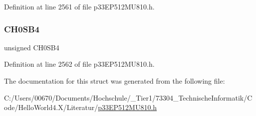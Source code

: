 Definition at line 2561 of file p33\+E\+P512\+M\+U810.\+h.

\mbox{\label{structtag_a_d1_c_h_s0_b_i_t_s_a4f65ab47f0d8e69cd9826d4a74fb614b}} 
\subsubsection{\texorpdfstring{C\+H0\+S\+B4}{CH0SB4}}
{\footnotesize\ttfamily unsigned C\+H0\+S\+B4}



Definition at line 2562 of file p33\+E\+P512\+M\+U810.\+h.



The documentation for this struct was generated from the following file\+:\begin{DoxyCompactItemize}
\item 
C\+:/\+Users/00670/\+Documents/\+Hochschule/\+\_\+\+Tier1/73304\+\_\+\+Technische\+Informatik/\+Code/\+Hello\+World4.\+X/\+Literatur/\hyperlink{p33_e_p512_m_u810_8h}{p33\+E\+P512\+M\+U810.\+h}\end{DoxyCompactItemize}
